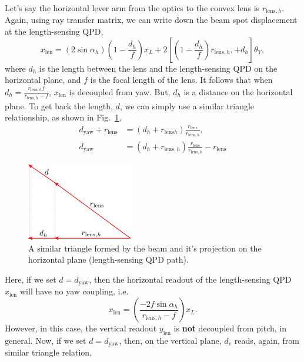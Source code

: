 Let's say the horizontal lever arm from the optics to the convex lens is $r_{\mathrm{lens},h}$.
Again, using ray transfer matrix, we can write down the  beam spot displacement at the length-sensing QPD,
\begin{equation}
	x_\mathrm{len} = \left(2\sin\alpha_h\right)\left(1-\frac{d_h}{f}\right)x_L + 2\left[\left(1-\frac{d_h}{f}\right)r_{\mathrm{lens},h},+d_h\right]\theta_Y,
	\label{eqn:x_len}
\end{equation}
where $d_h$ is the length between the lens and the length-sensing QPD on the horizontal plane, and $f$ is the focal length of the lens.
It follows that when $d_h=\frac{r_{\mathrm{lens},h}f}{r_{\mathrm{lens},h}-f}$, $x_\mathrm{len}$ is decoupled from yaw.
But, $d_h$ is a distance on the horizontal plane.
To get back the length, $d$, we can simply use a similar triangle relationship, as shown in Fig.~\ref{fig:dh},
\begin{equation}
	\begin{split}
	d_\mathrm{yaw} + r_\mathrm{lens} &= \left(d_h+r_{\mathrm{lens} h}\right)\frac{r_\mathrm{lens}}{r_{\mathrm{lens},h}},\\
	d_\mathrm{yaw} &= \left(d_h+r_{\mathrm{lens}, h}\right)\frac{r_\mathrm{lens}}{r_{\mathrm{lens},h}} - r_\mathrm{lens}
	\end{split}
\end{equation}
\begin{figure}[!h]
	\centering
	\includegraphics[width=0.2\linewidth]{figures/d_h}
	\caption{A similar triangle formed by the beam and it's projection on the horizontal plane (length-sensing QPD path).}
	\label{fig:dh}
\end{figure}
Here, if we set $d=d_\mathrm{yaw}$, then the horizontal readout of the length-sensing QPD $x_\mathrm{len}$ will have no yaw coupling, i.e.
\begin{equation}
	x_\mathrm{len} = \left(\frac{-2f\sin\alpha_h}{r_{\mathrm{lens},h}-f}\right)x_L.
\end{equation}
However, in this case, the vertical readout $y_\mathrm{len}$ is \textbf{not} decoupled from pitch, in general.
Now, if we set $d=d_\mathrm{yaw}$, then, on the vertical plane, $d_v$ reads, again, from similar triangle relation,
